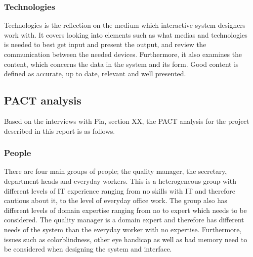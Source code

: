 \subsubsection{Technologies}
Technologies is the reflection on the medium which interactive system designers work with.
It covers looking into elements such as what medias and technologies is needed to best get input and present the output, and review the communication between the needed devices.
Furthermore, it also examines the content, which concerns the data in the system and its form.
Good content is defined as accurate, up to date, relevant and well presented.

\subsection{PACT analysis}\label{sec:PACT-analysis}
Based on the interviews with Pia,
{\color{red} section XX}, the PACT analysis for the project described in this report is as follows.

\subsubsection*{People}

There are four main groups of people; the quality manager, the secretary, department heads and everyday workers.
This is a heterogeneous group with different levels of IT experience ranging from no skills with IT and therefore cautious about it, to the level of everyday office work.
The group also has different levels of domain expertise ranging from no to expert which needs to be considered. The quality manager is a domain expert and therefore has different needs of the system than the everyday worker with no expertise.
\newline
Furthermore, issues such as colorblindness, other eye handicap as well as bad memory need to be considered when designing the system and interface.

